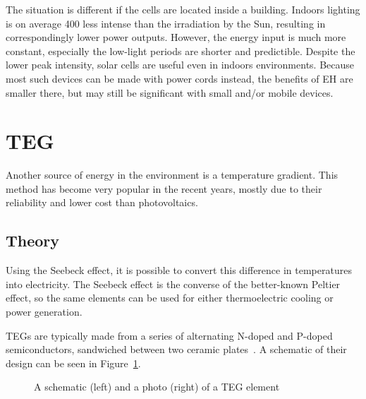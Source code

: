 \documentclass[a4paper,10pt]{article}
\begin{document}
The situation is different if the cells are located inside a building. Indoors lighting is on average 400 less intense than the irradiation by the Sun, resulting in correspondingly lower power outputs. However, the energy input is much more constant, especially the low-light periods are shorter and predictible. Despite the lower peak intensity, solar cells are useful even in indoors environments. Because most such devices can be made with power cords instead, the benefits of \ac{EH} are smaller there, but may still be significant with small and/or mobile devices. 

\section{\acl{TEG}}

Another source of energy in the environment is a temperature gradient. This method has become very popular in the recent years, mostly due to their reliability and lower cost than photovoltaics.

\subsection{Theory}

Using the Seebeck effect, it is possible to convert this difference in temperatures into electricity.  The Seebeck effect is the converse of the better-known Peltier effect, so the same elements can be used for either thermoelectric cooling or power generation. 

\acp{TEG} are typically made from a series of alternating N-doped and P-doped semiconductors, sandwiched between two ceramic plates~\cite{Salerno10}. A schematic of their design can be seen in Figure~\ref{fig:teg-schematic}.

\begin{figure}[h]
\caption{A schematic (left) and a photo (right) of a \ac{TEG} element~\cite{Salerno10,wiki:teg}}
\label{fig:teg-schematic}
\end{figure}
\end{document}
